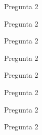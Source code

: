 \documentclass[aspectratio=169]{beamer}
\begin{document}
\begin{frame}
\begin{block}{Pregunta 2}

\end{block}
\end{frame}



\begin{frame}
\begin{block}{Pregunta 2}

\end{block}
\end{frame}



\begin{frame}
\begin{block}{Pregunta 2}

\end{block}
\end{frame}



\begin{frame}
\begin{block}{Pregunta 2}

\end{block}
\end{frame}




\begin{frame}
\begin{block}{Pregunta 2}

\end{block}
\end{frame}\begin{frame}
\begin{block}{Pregunta 2}

\end{block}
\end{frame}



\begin{frame}
\begin{block}{Pregunta 2}

\end{block}
\end{frame}




\begin{frame}
\begin{block}{Pregunta 2}

\end{block}
\end{frame}
\end{document}
